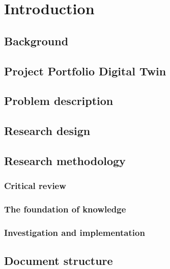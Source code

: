 \documentclass[a4paper,11pt,fleqn]{report}
\begin{document}
\chapter{Introduction}
\setcounter{page}{1}
\acresetall



\section{Background}



\section{Project Portfolio Digital Twin}



\section{Problem description}



\section{Research design}



\section{Research methodology}



\subsection{Critical review}



\subsection{The foundation of knowledge}  



\subsection{Investigation and implementation}



\section{Document structure}
\end{document}
